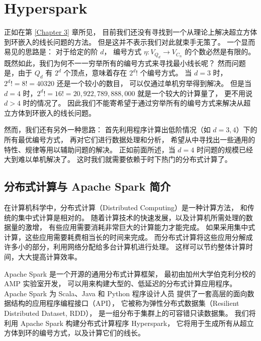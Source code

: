 
\chapter{Hyperspark}
\label{Chapter 4}

正如在第 \ref{Chapter 3} 章所见，
目前我们还没有寻找到一个从理论上解决超立方体到环嵌入的线长问题的方法。
但是这并不表示我们对此就束手无策了。
一个显而易见的思路是：
对于给定的阶 $d$，
编号方式 $\eta \colon V_{Q_d} \rightarrow V_{C_n}$ 的个数必然是有限的。
既然如此，我们为何不一一穷举所有的编号方式来寻找最小线长呢？
然而问题是，由于 $Q_d$ 有 $2^d$ 个顶点，意味着存在 $2^d !$ 个编号方式。
当 $d = 3$ 时，$2^d ! = 8 ! = 40320$ 还是一个较小的数目，
可以仅通过单机穷举得到解决。
但是当 $d = 4$ 时，$2^d ! = 16 ! = 20,922,789,888,000$ 就是一个较大的计算量了，
更不用说 $d > 4$ 时的情况了。
因此我们不能寄希望于通过穷举所有的编号方式来解决从超立方体到环嵌入的线长问题。

然而，我们还有另外一种思路：
首先利用程序计算出低阶情况（如 $d = 3, 4$）下的所有最优编号方式，
再对它们进行数据处理和分析，
希望从中寻找出一些通用的特性、规律等用以辅助问题的解决。
正如前面所述，当 $d = 4$ 时问题的规模已经大到难以单机解决了。
这时我们就需要依赖于时下热门的分布式计算了。

\section{分布式计算与 Apache Spark 简介}
\label{Section 4.1}

在计算机科学中，分布式计算（Distributed Computing）是一种计算方法，
和传统的集中式计算是相对的。
随着计算技术的快速发展，以及计算机所需处理的数据量的激增，
有些应用需要消耗非常巨大的计算能力才能完成。
如果采用集中式计算，这些应用需要耗费相当长的时间来完成。
而分布式计算将这些应用分解成许多小的部分，利用网络分配给多台计算机进行处理。
这样可以节约整体计算时间，大大提高计算效率。

Apache Spark 是一个开源的通用分布式计算框架，
最初由加州大学伯克利分校的 AMP 实验室开发，
可以用来构建大型的、低延迟的分布式计算应用程序。
Apache Spark 为 Scala、Java 和 Python 程序设计人员
提供了一套高层的面向数据结构的应用程序编程接口（API），
它被称为弹性分布式数据集（Resilient Distributed Dataset, RDD），
是一组分布于集群上的可容错只读数据集。
我们将利用 Apache Spark 构建分布式计算程序 Hyperspark，
它将用于生成所有从超立方体到环的编号方式，以及计算它们的线长。

